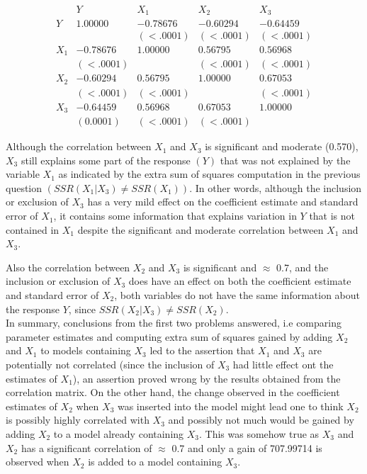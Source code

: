 \documentclass[a4paper,9pt]{article}\usepackage[]{graphicx}\usepackage[]{color}
\begin{document}
$$\begin{array}{c|cccc}
 & Y & X_1 & X_2 & X_3 \\
 \hline
Y & 1.00000 & -0.78676  & -0.60294 & -0.64459\\
 &  & (<.0001) & (<.0001) & (<.0001)\\
 \hline
X_1 & -0.78676 & 1.00000 & 0.56795 & 0.56968\\
 & (<.0001) &  & (<.0001) & (<.0001)\\
 \hline
X_2 & -0.60294  & 0.56795 & 1.00000 & 0.67053 \\
 & (<.0001) & (<.0001) &  & (<.0001)\\
 \hline
X_3 & -0.64459 & 0.56968 & 0.67053 & 1.00000 \\
 & (0.0001) &  (<.0001) & (<.0001) &
\end{array}$$

Although the correlation between $X_1$ and $X_3$ is significant and moderate (0.570), $X_3$ still explains some part of the response $(Y)$ that was not explained by the variable $X_1$ as indicated by the extra sum of squares computation in the previous question $(SSR(X_{1}|X_{3}) \neq SSR(X_{1}))$. In other words, although the inclusion or exclusion of $X_3$ has a very mild effect on the coefficient estimate and standard error of $X_1$, it contains some information that explains variation in $Y$ that is not contained in $X_1$ despite the significant and moderate correlation between $X_1$ and $X_3$.

Also the correlation between $X_2$ and $X_3$ is significant and $\approx$ 0.7, and the inclusion or exclusion of $X_3$ does have an effect on both the coefficient estimate and standard error of $X_2$, both variables do not have the same information about the response $Y$, since $SSR(X_{2}|X_{3}) \neq SSR(X_{2})$.\\

In summary, conclusions from the first two problems answered, i.e comparing parameter estimates and computing extra sum of squares gained by adding $X_2$ and $X_1$ to models containing $X_3$ led to the assertion that $X_1$ and $X_3$ are potentially not correlated (since the inclusion of $X_3$ had little effect ont the estimates of $X_1$), an assertion proved wrong by the results obtained from the correlation matrix. On the other hand, the change observed in the coefficient estimates of $X_2$ when $X_3$ was inserted into the model might lead one to think $X_2$ is possibly highly correlated with $X_3$ and possibly not much would be gained by adding $X_2$ to a model already containing $X_3$. This was somehow true as $X_3$ and $X_2$ has a significant correlation of $\approx$ 0.7 and only a gain of 707.99714 is observed when $X_2$ is added to a model containing $X_3$.
\end{document}
